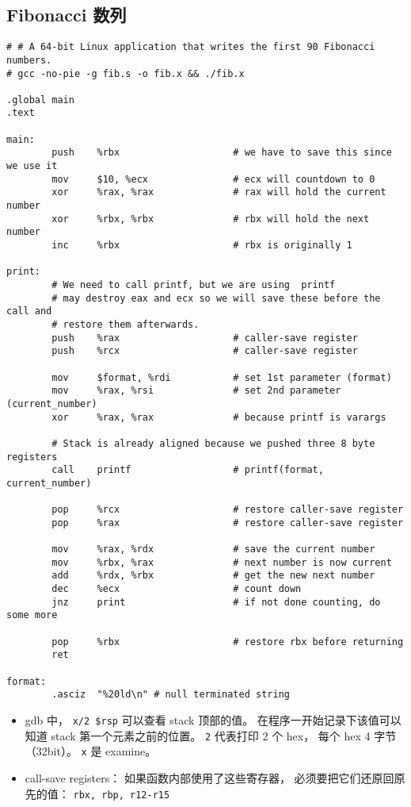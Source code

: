 \subsection{Fibonacci 数列}
\begin{lstlisting}[language=none, caption=fib.s]
# # A 64-bit Linux application that writes the first 90 Fibonacci numbers.
# gcc -no-pie -g fib.s -o fib.x && ./fib.x

.global main
.text

main:
        push    %rbx                    # we have to save this since we use it
        mov     $10, %ecx               # ecx will countdown to 0
        xor     %rax, %rax              # rax will hold the current number
        xor     %rbx, %rbx              # rbx will hold the next number
        inc     %rbx                    # rbx is originally 1

print:
        # We need to call printf, but we are using  printf
        # may destroy eax and ecx so we will save these before the call and
        # restore them afterwards.
        push    %rax                    # caller-save register
        push    %rcx                    # caller-save register

        mov     $format, %rdi           # set 1st parameter (format)
        mov     %rax, %rsi              # set 2nd parameter (current_number)
        xor     %rax, %rax              # because printf is varargs

        # Stack is already aligned because we pushed three 8 byte registers
        call    printf                  # printf(format, current_number)

        pop     %rcx                    # restore caller-save register
        pop     %rax                    # restore caller-save register

        mov     %rax, %rdx              # save the current number
        mov     %rbx, %rax              # next number is now current
        add     %rdx, %rbx              # get the new next number
        dec     %ecx                    # count down
        jnz     print                   # if not done counting, do some more

        pop     %rbx                    # restore rbx before returning
        ret

format:
        .asciz  "%20ld\n" # null terminated string
\end{lstlisting}

\begin{itemize}
\item gdb 中， \verb|x/2 $rsp| 可以查看 stack 顶部的值。 在程序一开始记录下该值可以知道 stack 第一个元素之前的位置。 \verb|2| 代表打印 2 个 hex， 每个 hex 4 字节（32bit）。 \verb|x| 是 examine。
\item call-save registers： 如果函数内部使用了这些寄存器， 必须要把它们还原回原先的值： \verb|rbx, rbp, r12-r15|
\end{itemize}

